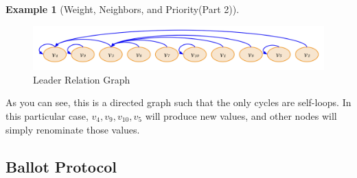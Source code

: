 \documentclass[12pt, psamsfonts]{amsart}
\theoremstyle{definition}
\newtheorem{exmp}[thm]{Example}
\theoremstyle{remark}
\numberwithin{equation}{subsection}
\begin{document}
\begin{exmp}[Weight, Neighbors, and Priority(Part 2)]
    \begin{figure}[!htb]
        \includegraphics[width=.8\linewidth]{img/leader_election.jpeg}
        \caption{Leader Relation Graph}
        \label{fig:leader_relation}
    \end{figure}

    As you can see, this is a directed graph such that the only cycles are self-loops.
    In this particular case, $v_4, v_9, v_{10}, v_5$ will produce new values, and other nodes will simply renominate those values.
\end{exmp}

\newpage
\subsection{Ballot Protocol}
\end{document}

